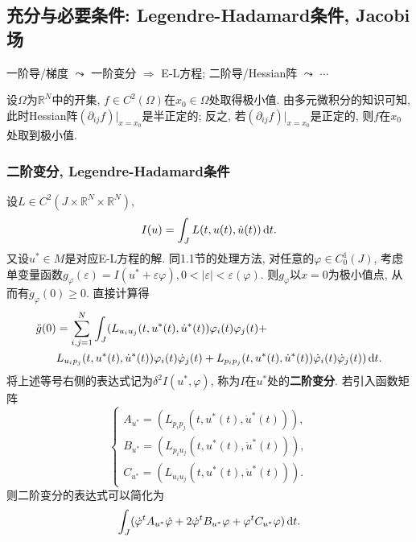 \documentclass[12pt,a4paper]{article}
\begin{document}
\subsection{充分与必要条件: Legendre-Hadamard条件, Jacobi场}

一阶导/梯度 $\leadsto$ 一阶变分 $\Rightarrow$ E-L方程;
二阶导/Hessian阵 $\leadsto$ $\cdots$

设$\Omega$为$\mathbb{R}^N$中的开集, $f \in C^2(\Omega)$在$x_0 \in \Omega$处取得极小值.
由多元微积分的知识可知, 此时Hessian阵$(\partial_{ij}f)|_{x = x_0}$是半正定的; 反之, 若$(\partial_{ij}f)|_{x = x_0}$是正定的, 则$f$在$x_0$处取到极小值.

\subsubsection{二阶变分, Legendre-Hadamard条件}

设$L \in C^2(J \times \mathbb{R}^N \times \mathbb{R}^N)$, 
\begin{equation*}
    I(u) = \int_JL(t, u(t), \dot{u}(t)) \,{\rm d}t.
\end{equation*}
又设$u^* \in M$是对应E-L方程的解. 同1.1节的处理方法, 对任意的$\varphi \in C_0^1(J)$, 考虑单变量函数$g_{\varphi}(\varepsilon) = I(u^* + \varepsilon\varphi), 0 < |\varepsilon| < \varepsilon(\varphi)$.
则$g_{\varphi}$以$x = 0$为极小值点, 从而有$\ddot g_{\varphi}(0) \geq 0$. 直接计算得 
\begin{align*}
    \ddot{g}(0) &= \sum\limits_{i, j = 1}^N\int_J(L_{u_iu_j}(t, u^*(t), \dot{u}^*(t))\varphi_i(t)\varphi_j(t) + \\
    &L_{u_ip_j}(t, u^*(t), \dot{u}^*(t))\varphi_i(t)\dot{\varphi}_j(t) + L_{p_ip_j}(t, u^*(t), \dot{u}^*(t))\dot{\varphi}_i(t)\dot{\varphi}_j(t)) \,{\rm d}t.
\end{align*}
将上述等号右侧的表达式记为$\delta^2I(u^*, \varphi)$, 称为$I$在$u^*$处的\textbf{二阶变分}.
若引入函数矩阵
\begin{equation*}
    \begin{cases} 
        A_{u^*} = (L_{p_ip_j}(t, u^*(t), \dot{u}^*(t))), \\  
        B_{u^*} = (L_{p_iu_j}(t, u^*(t), \dot{u}^*(t))), \\  
        C_{u^*} = (L_{u_iu_j}(t, u^*(t), \dot{u}^*(t))).   
    \end{cases}
\end{equation*}
则二阶变分的表达式可以简化为 
\begin{equation*}
    \int_J(\dot\varphi^tA_{u^*}\dot{\varphi} + 2\dot{\varphi}^tB_{u^*}\varphi + \varphi^tC_{u^*}\varphi) \,{\rm d}t.
\end{equation*}
\end{document}
